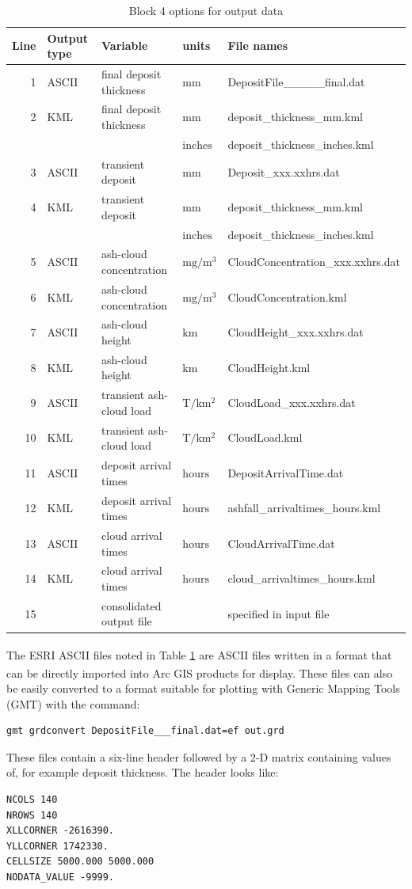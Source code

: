 \begin{table}[htbp]
\begin{center}
\begin{tabular}{|r|l|l|l|l|}
\hline
Line & Output type&Variable&units & File names\\
\hline
 1&ASCII &final deposit thickness&$\mathrm{mm}$&DepositFile\_\_\_\_\_final.dat\\
 2&KML&final deposit thickness&$\mathrm{mm}$&deposit\_thickness\_mm.kml\\
  & & &$\mathrm{inches}$&deposit\_thickness\_inches.kml\\
 3&ASCII &transient deposit&$\mathrm{mm}$&Deposit\_xxx.xxhrs.dat\\
 4&KML&transient deposit&$\mathrm{mm}$&deposit\_thickness\_mm.kml\\
  & & &$\mathrm{inches}$&deposit\_thickness\_inches.kml\\
 5&ASCII &ash-cloud concentration&$\mathrm{mg/m^3}$&CloudConcentration\_xxx.xxhrs.dat\\
 6&KML& ash-cloud concentration&$\mathrm{mg/m^3}$&CloudConcentration.kml\\
 7&ASCII&ash-cloud height&$\mathrm{km}$&CloudHeight\_xxx.xxhrs.dat\\
 8&KML&ash-cloud height&$\mathrm{km}$&CloudHeight.kml\\
 9&ASCII&transient ash-cloud load&$\mathrm{T/km^2}$&CloudLoad\_xxx.xxhrs.dat\\
10&KML&transient ash-cloud load&$\mathrm{T/km^2}$&CloudLoad.kml\\
11&ASCII&deposit arrival times&$\mathrm{hours}$&DepositArrivalTime.dat\\
12&KML&deposit arrival times&$\mathrm{hours}$&ashfall\_arrivaltimes\_hours.kml\\
13&ASCII&cloud arrival times&$\mathrm{hours}$&CloudArrivalTime.dat\\
14&KML&cloud arrival times&$\mathrm{hours}$&cloud\_arrivaltimes\_hours.kml\\
15&&consolidated output file&&specified in input file\\
\hline
\end{tabular}
\caption{\label{tab:OutputOptions}Block 4 options for output data}
\end{center}
\end{table}
\normalsize
The ESRI\textsuperscript{\tiny\textregistered} ASCII files noted in Table \ref{tab:OutputOptions}
are ASCII files written in a format that
can be directly imported into Arc\textsuperscript{\tiny\textregistered}
GIS products for display.
These files can also be easily converted to a format suitable for plotting with
Generic Mapping Tools (GMT) with the command:
\begin{verbatim}
gmt grdconvert DepositFile___final.dat=ef out.grd
\end{verbatim}
These files contain a six-line
header followed by a 2-D matrix containing values of, for example deposit thickness.
The header looks like:
\small
\begin{verbatim}
NCOLS 140
NROWS 140
XLLCORNER -2616390.
YLLCORNER 1742330.
CELLSIZE 5000.000 5000.000
NODATA_VALUE -9999.
\end{verbatim}
\normalsize

